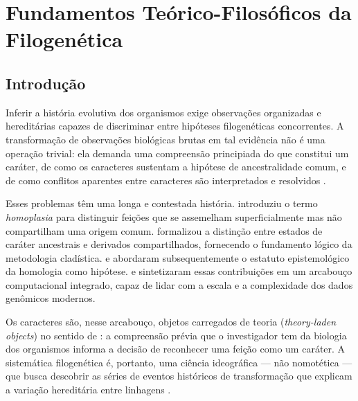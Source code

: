 
\chapter{Fundamentos Teórico-Filosóficos da Filogenética}

\section{Introdução}

Inferir a história evolutiva dos organismos exige observações organizadas e hereditárias capazes de discriminar entre hipóteses filogenéticas concorrentes. A transformação de observações biológicas brutas em tal evidência não é uma operação trivial: ela demanda uma compreensão principiada do que constitui um caráter, de como os caracteres sustentam a hipótese de ancestralidade comum, e de como conflitos aparentes entre caracteres são interpretados e resolvidos \parencite{wheeleretal2006}.

Esses problemas têm uma longa e contestada história. \textcite{lankester1870} introduziu o termo \textit{homoplasia} para distinguir feições que se assemelham superficialmente mas não compartilham uma origem comum. \textcite{hennig1966} formalizou a distinção entre estados de caráter ancestrais e derivados compartilhados, fornecendo o fundamento lógico da metodologia cladística. \textcite{depinna1991} e \textcite{patterson1982} abordaram subsequentemente o estatuto epistemológico da homologia como hipótese. \textcite{wheeleretal2006} e \textcite{wheeler2012} sintetizaram essas contribuições em um arcabouço computacional integrado, capaz de lidar com a escala e a complexidade dos dados genômicos modernos.

Os caracteres são, nesse arcabouço, objetos carregados de teoria (\textit{theory-laden objects}) no sentido de \textcite{popper1959}: a compreensão prévia que o investigador tem da biologia dos organismos informa a decisão de reconhecer uma feição como um caráter. A sistemática filogenética é, portanto, uma ciência ideográfica --- não nomotética --- que busca descobrir as séries de eventos históricos de transformação que explicam a variação hereditária entre linhagens \parencite{grant2004ts}.

